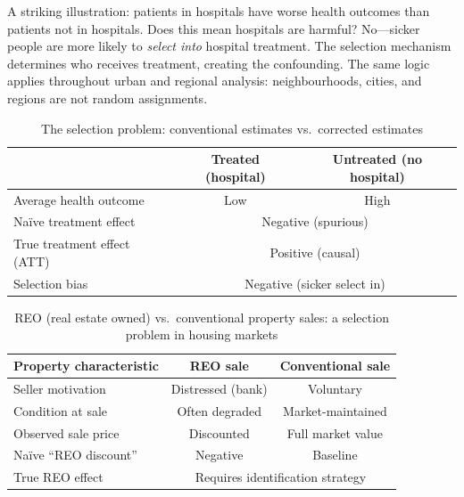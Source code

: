 A striking illustration: patients in hospitals have worse health outcomes than
patients not in hospitals. Does this mean hospitals are harmful? No---sicker
people are more likely to \emph{select into} hospital treatment. The
selection mechanism determines who receives treatment, creating the
confounding. The same logic applies throughout urban and regional analysis:
neighbourhoods, cities, and regions are not random assignments.

\begin{table}[htp]
\centering
\caption{The selection problem: conventional estimates vs.\ corrected estimates}
\label{tbl_Selection1}
\renewcommand{\arraystretch}{1.4}
\begin{tabular}{@{}lcc@{}}
\toprule
& \textbf{Treated (hospital)} & \textbf{Untreated (no hospital)} \\
\midrule
Average health outcome       & Low    & High \\
Na\"{i}ve treatment effect   & \multicolumn{2}{c}{Negative (spurious)} \\
True treatment effect (ATT)  & \multicolumn{2}{c}{Positive (causal)} \\
Selection bias               & \multicolumn{2}{c}{Negative (sicker select in)} \\
\bottomrule
\end{tabular}
\renewcommand{\arraystretch}{1}
\end{table}

\begin{table}[htp]
\centering
\caption{REO (real estate owned) vs.\ conventional property sales:
a selection problem in housing markets}
\label{tbl_Selection2}
\renewcommand{\arraystretch}{1.4}
\begin{tabular}{@{}lcc@{}}
\toprule
Property characteristic & REO sale & Conventional sale \\
\midrule
Seller motivation       & Distressed (bank) & Voluntary \\
Condition at sale       & Often degraded    & Market-maintained \\
Observed sale price     & Discounted        & Full market value \\
Na\"{i}ve ``REO discount'' & Negative      & Baseline \\
True REO effect         & \multicolumn{2}{c}{Requires identification strategy} \\
\bottomrule
\end{tabular}
\renewcommand{\arraystretch}{1}
\end{table}

